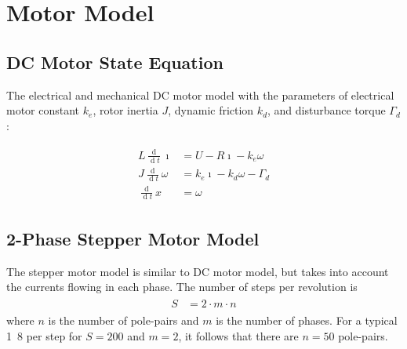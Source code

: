 \documentclass[12pt,a4paper,oneside,openany]{article}
\DeclareMathOperator{\ud}{d}
\begin{document}
\section{Motor Model}

\subsection{DC Motor State Equation}

The electrical and mechanical DC motor model with the parameters of  electrical motor constant $k_e$, rotor inertia $J$, dynamic friction $k_d$, and disturbance torque $\Gamma_d$:

\begin{gather}
\begin{aligned}
L\frac{\ud }{\ud t} \imath&= U - R \imath - k_e \omega \\
J \frac{\ud }{\ud t} \omega &= k_e \imath - k_d \omega - \Gamma_d \\
\frac{\ud}{\ud t} x &= \omega
\end{aligned}
\end{gather}

\subsection{2-Phase Stepper Motor Model}

The stepper motor model is similar to DC motor model, but takes into account the currents flowing in each phase. The number of steps per revolution is
\begin{gather}
\begin{aligned}
S &= 2 \cdot m \cdot n
\end{aligned}
\end{gather}
where $n$ is the number of pole-pairs and $m$ is the number of phases. For a typical \unit{1.8}{\degree} per step for $S=200$ and $m=2$, it follows that there are $n=50$ pole-pairs.
\end{document}
